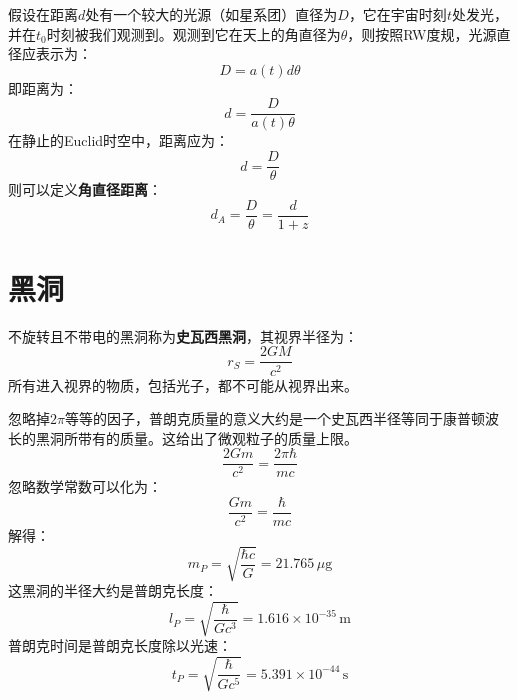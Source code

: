 \documentclass[fontset=none,openany,a4paper]{ctexbook}
\begin{document}
假设在距离$d$处有一个较大的光源（如星系团）直径为$D$，它在宇宙时刻$t$处发光，并在$t_0$时刻被我们观测到。观测到它在天上的角直径为$\theta$，则按照RW度规，光源直径应表示为：
\begin{equation}
    D = a(t)d\theta
\end{equation}
即距离为：
\begin{equation}
    d = \frac{D}{a(t)\theta}
\end{equation}
在静止的Euclid时空中，距离应为：
\begin{equation}
    d = \frac{D}{\theta}
\end{equation}
则可以定义\textbf{角直径距离}：
\begin{equation}
    d_A = \frac{D}{\theta} = \frac{d}{1 + z}
\end{equation}


\chapter{黑洞}

不旋转且不带电的黑洞称为\textbf{史瓦西黑洞}，其视界半径为：
\begin{equation}
    r_S = \frac{2GM}{c^2}
\end{equation}
所有进入视界的物质，包括光子，都不可能从视界出来。

忽略掉$2\pi$等等的因子，普朗克质量的意义大约是一个史瓦西半径等同于康普顿波长的黑洞所带有的质量。这给出了微观粒子的质量上限。
\begin{equation}
    \frac{2Gm}{c^2} = \frac{2\pi\hbar}{mc}
\end{equation}
忽略数学常数可以化为：
\begin{equation}
    \frac{Gm}{c^2} = \frac{\hbar}{mc}
\end{equation}
解得：
\begin{equation}
    m_P = \sqrt{\frac{\hbar c}{G}} = 21.765\,\mu\mathrm{g}
\end{equation}
这黑洞的半径大约是普朗克长度：
\begin{equation}
    l_P = \sqrt{\frac{\hbar}{Gc^3}} = 1.616 \times 10^{-35}\,\mathrm{m}
\end{equation}
普朗克时间是普朗克长度除以光速：
\begin{equation}
    t_P = \sqrt{\frac{\hbar}{Gc^5}} = 5.391 \times 10^{-44}\,\mathrm{s}
\end{equation}
\end{document}
